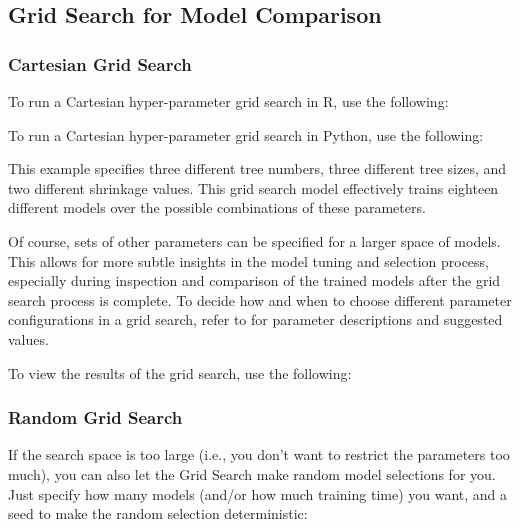 \subsection{Grid Search for Model Comparison}
\label{ssec:Grid search}

\subsubsection{Cartesian Grid Search}
To run a Cartesian hyper-parameter grid search in R, use the following:

\waterExampleInR


To run a Cartesian hyper-parameter grid search in Python, use the following:

\waterExampleInPython


This example specifies three different tree numbers, three different tree sizes, and two different shrinkage values. This grid search model effectively trains eighteen different models over the possible combinations of these parameters.

Of course, sets of other parameters can be specified for a larger space of models. This allows for more subtle insights in the model tuning and selection process, especially during inspection and comparison of the trained models after the grid search process is complete. To decide how and when to choose different parameter configurations in a grid search, refer to {\textbf{}} for parameter descriptions and suggested values.

To view the results of the grid search, use the following: 

\waterExampleInR


\waterExampleInPython
 

\subsubsection{Random Grid Search}
If the search space is too large (i.e., you don't want to restrict the parameters too much), you can also let the Grid Search make random model selections for you. Just specify how many models (and/or how much training time) you want, and a seed to make the random selection deterministic:

